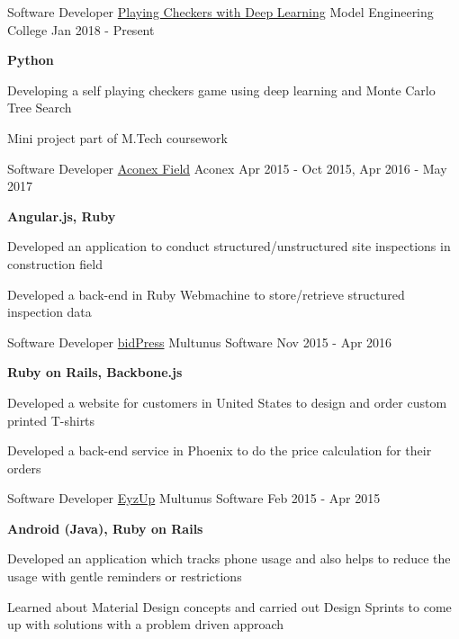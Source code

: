 \begin{cventries} 
  \cventry
    {Software Developer}
    {\href{}{Playing Checkers with Deep Learning}}
    {Model Engineering College}
    {Jan 2018 - Present}
    {
      \begin{cvitems}
        \item {\textbf{Python}}
        \item {Developing a self playing checkers game using deep learning and Monte Carlo Tree Search}
        \item {Mini project part of M.Tech coursework}
      \end{cvitems}
    }
  \cventry
    {Software Developer}
    {\href{https://www.aconex.com/support/aconex-field}{Aconex Field}}
    {Aconex}
    {Apr 2015 - Oct 2015, Apr 2016 - May 2017}
    {
      \begin{cvitems}
        \item {\textbf{Angular.js, Ruby}}
        \item {Developed an application to conduct structured/unstructured site inspections in construction field}
        \item {Developed a back-end in Ruby Webmachine to store/retrieve structured inspection data}
      \end{cvitems}
    }
  \cventry
    {Software Developer}
    {\href{https://www.bidpress.com/}{bidPress}}
    {Multunus Software}
    {Nov 2015 - Apr 2016}
    {
      \begin{cvitems}
        \item {\textbf{Ruby on Rails, Backbone.js}}
        \item {Developed a website for customers in United States to design and order custom printed T-shirts}
        \item {Developed a back-end service in Phoenix to do the price calculation for their orders}
      \end{cvitems}
    }
  \cventry
    {Software Developer}
    {\href{https://play.google.com/store/apps/details?id=com.eyz_up.android}{EyzUp}}
    {Multunus Software}
    {Feb 2015 - Apr 2015}
    {
      \begin{cvitems}
        \item {\textbf{Android (Java), Ruby on Rails}}
        \item {Developed an application which tracks phone usage and also helps to reduce the usage with gentle reminders or restrictions}
        \item {Learned about Material Design concepts and carried out Design Sprints to come up with solutions with a problem driven approach}

\end{cvitems}}
\end{cventries}
